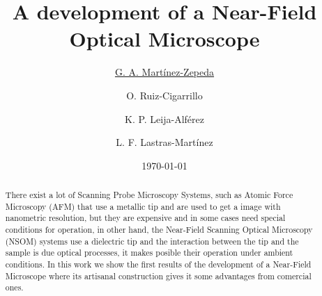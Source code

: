 \documentclass[reprint,aps,prb,citeautoscript,altaffilletter]{revtex4-2}
\begin{document}
	
	
	\title{ A development of a Near-Field Optical Microscope }
	\author{\underline{G. A. Mart\'inez-Zepeda}}
	\author{O. Ruiz-Cigarrillo}
	\author{{K. P. Leija-Alf\'erez}}
	\author{L. F. Lastras-Mart\'inez}
	
	\date{\today}
	
	\begin{abstract}
		There exist a lot of Scanning Probe Microscopy Systems, such as Atomic Force Microscopy (AFM) that use a metallic tip and are used to get a image with nanometric resolution, but they are expensive  and in some cases need special conditions for operation, in other hand, the Near-Field Scanning Optical Microscopy (NSOM) systems use a dielectric tip
		and the interaction between the tip and the sample is due optical processes, it makes posible their operation under ambient conditions. In this work we show the first results of the development  of a Near-Field Microscope where its artisanal construction gives it some advantages from comercial ones.
		
	\end{abstract}
	
	\maketitle
	

	
%	
%	
	
\end{document}
